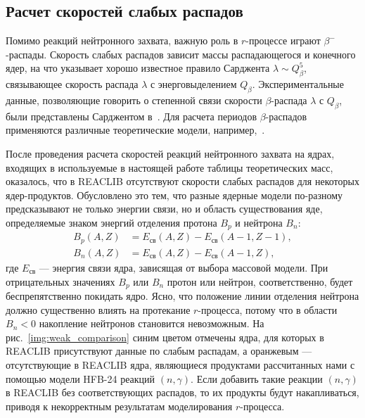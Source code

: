 \subsection{Расчет скоростей слабых распадов} \label{sec:weakfit}

  Помимо реакций нейтронного захвата, важную роль в $r$-процессе играют $\beta^-$-распады. Скорость слабых распадов зависит массы распадающегося и конечного ядер, на что указывает хорошо известное правило Сарджента $\lambda \sim Q_\beta^5$, связывающее скорость распада $\lambda$ с энерговыделением $Q_\beta$. Экспериментальные данные, позволяющие говорить о степенной связи скорости $\beta$-распада $\lambda$ с $Q_\beta$, были представлены Сарджентом в~\cite{sargent1933}. Для расчета периодов $\beta$-распадов применяются различные теоретические модели, например,~\cite{moller2003}. 


  После проведения расчета скоростей реакций нейтронного захвата на ядрах, входящих в используемые в настоящей работе таблицы теоретических масс, оказалось, что в REACLIB отсутствуют скорости слабых распадов для некоторых ядер-продуктов.  Обусловлено это тем, что разные ядерные модели по-разному предсказывают не только энергии связи, но и область существования яде, определяемые знаком энергий отделения протона $B_p$ и нейтрона $B_n$:
  \begin{equation}\begin{aligned}\label{eq:driplines}
    B_p(A,Z) &= E_{\text{св}}(A,Z) - E_{\text{св}}(A-1,Z-1),\\
    B_n(A,Z) &= E_{\text{св}}(A,Z) - E_{\text{св}}(A-1,Z),
  \end{aligned}\end{equation}
  где $E_{\text{св}}$ --- энергия связи ядра, зависящая от выбора массовой модели. При отрицательных значениях $B_p$ или $B_n$ протон или нейтрон, соответственно, будет беспрепятственно покидать ядро. Ясно, что положение линии отделения нейтрона должно существенно влиять на протекание $r$-процесса, потому что в области $B_n < 0$ накопление нейтронов становится невозможным. На рис.~\ref{img:weak_comparison} синим цветом отмечены ядра, для которых в REACLIB присутствуют данные по слабым распадам, а оранжевым --- отсутствующие в REACLIB ядра, являющиеся продуктами рассчитанных нами с помощью модели HFB-24 реакций $(n,\gamma)$. Если добавить такие реакции $(n,\gamma)$ в REACLIB без соответствующих распадов, то их продукты будут накапливаться, приводя к некорректным результатам моделирования $r$-процесса.

